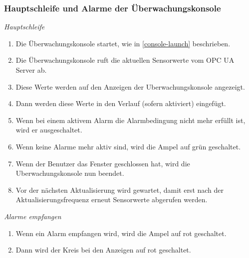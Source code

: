 \documentclass[parskip=full]{scrartcl}
\begin{document}
\subsubsection{Hauptschleife und Alarme der Überwachungskonsole}
\emph{Hauptschleife}
\begin{enumerate}[noitemsep]
 \item Die Überwachungskonsole startet, wie in \ref{console-launch} beschrieben.
 \item Die Überwachungskonsole ruft die aktuellen Sensorwerte vom \gls{OPC UA Server} ab.
 \item Diese Werte werden auf den Anzeigen der \gls{Uberwachungskonsole} angezeigt.
 \item Dann werden diese Werte in den Verlauf (sofern aktiviert) eingefügt.
 \item Wenn bei einem aktivem Alarm die Alarmbedingung nicht mehr erfüllt ist, wird er ausgeschaltet.
 \item Wenn keine Alarme mehr aktiv sind, wird die Ampel auf grün geschaltet.
 \item Wenn der Benutzer das Fenster geschlossen hat, wird die \gls{Uberwachungskonsole} nun beendet.
 \item Vor der nächsten Aktualisierung wird gewartet, damit erst nach der Aktualisierungsfrequenz erneut Sensorwerte abgerufen werden.
\end{enumerate}
\emph{Alarme empfangen}
\begin{enumerate}[noitemsep]
 \item Wenn ein Alarm empfangen wird, wird die Ampel auf rot geschaltet.
 \item Dann wird der Kreis bei den Anzeigen auf rot geschaltet.
\end{enumerate}
\end{document}
